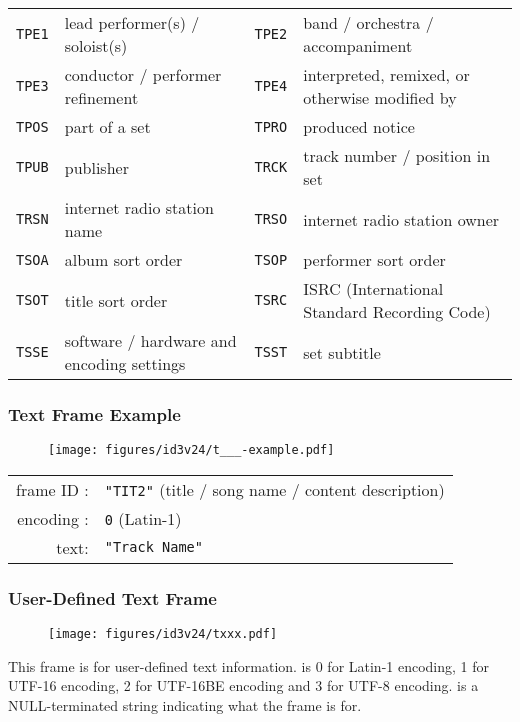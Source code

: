 \begin{table}[h]
{\begin{tabular}{|c|l||c|l|}
      \texttt{TPE1} & lead performer(s) / soloist(s) &
      \texttt{TPE2} & band / orchestra / accompaniment \\
      \texttt{TPE3} & conductor / performer refinement &
      \texttt{TPE4} & interpreted, remixed, or otherwise modified by \\
      \texttt{TPOS} & part of a set &
      \texttt{TPRO} & produced notice \\
      \texttt{TPUB} & publisher &
      \texttt{TRCK} & track number / position in set \\
      \texttt{TRSN} & internet radio station name &
      \texttt{TRSO} & internet radio station owner \\
      \texttt{TSOA} & album sort order &
      \texttt{TSOP} & performer sort order \\
      \texttt{TSOT} & title sort order &
      \texttt{TSRC} & ISRC (International Standard Recording Code) \\
      \texttt{TSSE} & software / hardware and encoding settings &
      \texttt{TSST} & set subtitle \\
      \hline
    \end{tabular}
  }
\end{table}

\clearpage

\subsubsection{Text Frame Example}
\begin{figure}[h]
  \texttt{[image: figures/id3v24/t\_\_\_-example.pdf]}
\end{figure}
\begin{table}[h]
\begin{tabular}{rl}
frame ID : & \texttt{"TIT2"} (title / song name / content description) \\
encoding : & \texttt{0} (Latin-1) \\
text: & \texttt{"Track Name"} \\
\end{tabular}
\end{table}

\subsubsection{User-Defined Text Frame}
\begin{figure}[h]
  \texttt{[image: figures/id3v24/txxx.pdf]}
\end{figure}
\par
\noindent
This frame is for user-defined text information.
 is 0 for Latin-1 encoding, 1 for UTF-16 encoding,
2 for UTF-16BE encoding and 3 for UTF-8 encoding.
 is a NULL-terminated string indicating
what the frame is for.

